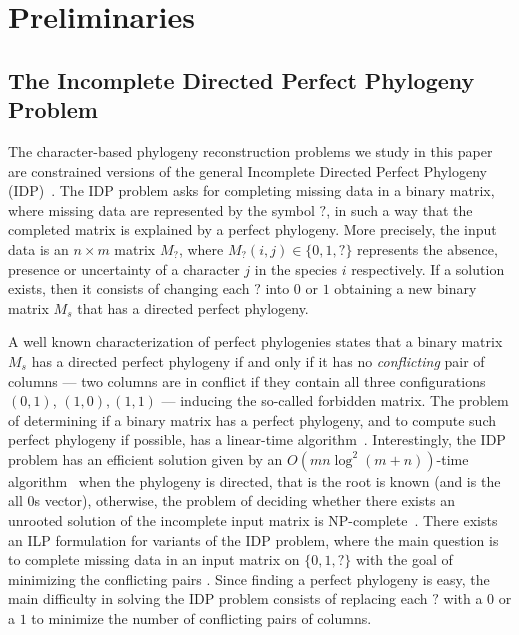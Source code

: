 \documentclass[a4paper,USenglish]{article}
\theoremstyle{definition}
\begin{document}
\section{Preliminaries}
\label{sec:preliminaries}



\subsection{The Incomplete Directed Perfect Phylogeny Problem}
\label{sec:idpp}

The character-based phylogeny reconstruction problems we study in this
  paper are constrained versions of the general Incomplete Directed
  Perfect  Phylogeny (IDP)~\cite{Peer_2004}.
The IDP problem asks for completing missing data in a binary matrix, where
  missing data are represented by the symbol $?$, in such a way that the
  completed matrix is explained by a perfect phylogeny.
More precisely, the input data is an $n\times m$ matrix $M_{?}$, where
  $M_{?}(i,j)\in \{0,1,?\}$ represents the absence, presence or
  uncertainty of a character $j$ in the species $i$ respectively.
If a solution  exists, then it consists of changing  each $?$ into $0$
  or $1$  obtaining a new  binary matrix  $M_{s}$ that has  a directed
  perfect phylogeny. 
 
A well  known characterization  of perfect  phylogenies states  that a
  binary matrix $M_{s}$ has a directed perfect phylogeny if and only if
  it has  no \emph{conflicting}  pair of columns ---  two columns  are in
  conflict  if  they contain  all  three configurations  $(0,1)$,
  $(1,0), (1,1)$ --- inducing the so-called forbidden matrix.
The problem of  determining if a binary  matrix has a perfect  phylogeny, and to
  compute  such  perfect  phylogeny  if possible,  has  a  linear-time
  algorithm~\cite{Gusfield91,Gusfield}. 
Interestingly, the IDP  problem has an efficient solution  given by an
  $O(mn\log^{2}(m+n))$-time algorithm~\cite{Peer_2004} when the
  phylogeny is directed, that  is the root is known (and  is the all $0$s
  vector), otherwise,  the problem of  deciding whether there  exists an
  unrooted    solution   of    the    incomplete    input   matrix    is
  NP-complete~\cite{steel1992complexity}.
There exists an ILP formulation for variants  of the IDP problem, where the main
  question is to complete missing data in an input matrix on $\{0,1,?\}$ with the
  goal of minimizing the conflicting pairs \cite{Gusfield2007}. 
Since finding  a perfect phylogeny is  easy, the main difficulty  in solving the
  IDP problem consists of replacing each $?$ with a $0$ or a $1$ to minimize the
  number of conflicting pairs of columns.
%
\end{document}
